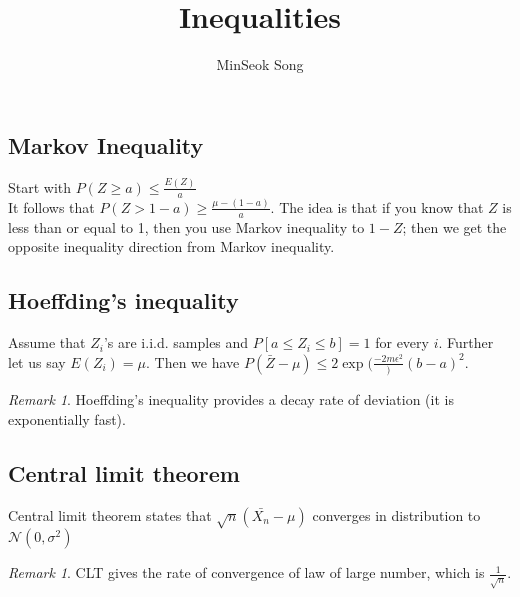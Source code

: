 \documentclass{article}
\title{Inequalities}
\author{MinSeok Song}
\date{}
\theoremstyle{remark}
\newtheorem{remark}[example]{Remark}
\begin{document}
\maketitle
\subsection*{Markov Inequality}
Start with $P(Z\geq a)\leq \frac{E(Z)}a$\\
It follows that $P(Z>1-a)\geq \frac{\mu-(1-a)}a$. The idea is that if you know that $Z$ is less than or equal to 1, then you use Markov inequality to $1-Z$; then we get the opposite inequality direction from Markov inequality. 

\subsection*{Hoeffding's inequality}
Assume that $Z_i$'s are i.i.d. samples and $P[a\leq Z_i\leq b]=1$ for every $i$. Further let us say $E(Z_i)=\mu$. Then we have $P(\bar Z-\mu)\leq 2\exp(\frac{-2m\epsilon^2}){(b-a)^2}$.
\begin{remark}
Hoeffding's inequality provides a decay rate of deviation (it is exponentially fast). 
\end{remark}

\subsection*{Central limit theorem}
Central limit theorem states that $\sqrt n(\bar{X_n}-\mu)$ converges in distribution to $\mathcal{N}(0,\sigma^2)$
\begin{remark}
CLT gives the rate of convergence of law of large number, which is $\frac{1}{\sqrt{n}}$.
\end{remark}
\end{document}
